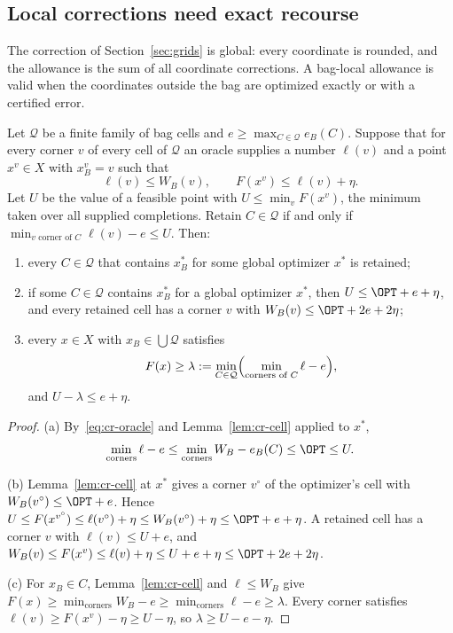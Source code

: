 \subsection{Local corrections need exact recourse}\label{sec:local}
The correction of Section~\ref{sec:grids} is global: every coordinate is
rounded, and the allowance is the sum of all coordinate corrections. A
bag-local allowance is valid when the coordinates outside the bag are
optimized exactly or with a certified error.

\begin{theorem}\label{thm:cr-filter}
Let $\mathcal Q$ be a finite family of bag cells and
$e\ge\max_{C\in\mathcal Q}e_B(C)$. Suppose that for every corner $v$ of
every cell of $\mathcal Q$ an oracle supplies a number $\ell(v)$ and a
point $x^v\in X$ with $x^v_B=v$ such that
\begin{equation}\label{eq:cr-oracle}
\ell(v)\le W_B(v),\qquad F(x^v)\le\ell(v)+\eta .
\end{equation}
Let $U$ be the value of a feasible point with $U\le\min_vF(x^v)$, the
minimum taken over all supplied completions. Retain $C\in\mathcal Q$ if
and only if $\min_{v\text{ corner of }C}\ell(v)-e\le U$. Then:
\begin{enumerate}
\item[(a)] every $C\in\mathcal Q$ that contains $x^*_B$ for some global
optimizer $x^*$ is retained;
\item[(b)] if some $C\in\mathcal Q$ contains $x^*_B$ for a global optimizer
$x^*$, then $U\le\OPT+e+\eta$, and every retained cell has a corner $v$
with $W_B(v)\le\OPT+2e+2\eta$;
\item[(c)] every $x\in X$ with $x_B\in\bigcup\mathcal Q$ satisfies
\[
F(x)\ge\lambda:=\min_{C\in\mathcal Q}\Bigl(\min_{\text{corners of }C}\ell-e\Bigr),
\]
and $U-\lambda\le e+\eta$.
\end{enumerate}
\end{theorem}
\begin{proof}
(a) By~\eqref{eq:cr-oracle} and Lemma~\ref{lem:cr-cell} applied to $x^*$,
\[
\min_{\text{corners}}\ell-e\le\min_{\text{corners}}W_B-e_B(C)\le\OPT\le U.
\]

(b) Lemma~\ref{lem:cr-cell} at $x^*$ gives a corner $v^\circ$ of the
optimizer's cell with $W_B(v^\circ)\le\OPT+e$. Hence
$U\le F(x^{v^\circ})\le\ell(v^\circ)+\eta\le W_B(v^\circ)+\eta\le\OPT+e+\eta$.
A retained cell has a corner $v$ with $\ell(v)\le U+e$, and
$W_B(v)\le F(x^v)\le\ell(v)+\eta\le U+e+\eta\le\OPT+2e+2\eta$.

(c) For $x_B\in C$, Lemma~\ref{lem:cr-cell} and $\ell\le W_B$ give
$F(x)\ge\min_{\text{corners}}W_B-e\ge\min_{\text{corners}}\ell-e\ge\lambda$.
Every corner satisfies $\ell(v)\ge F(x^v)-\eta\ge U-\eta$, so
$\lambda\ge U-e-\eta$.
\end{proof}

